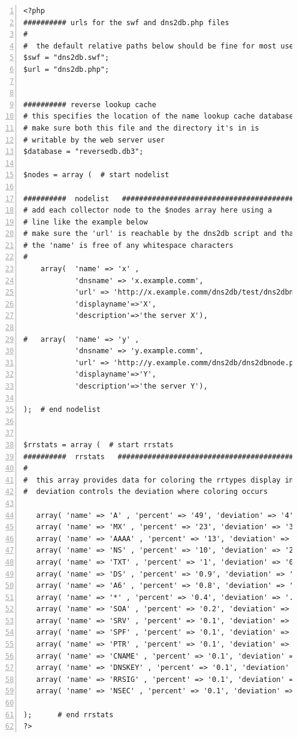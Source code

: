 \documentclass[a4paper]{article}
\begin{document}
\begin{Verbatim}[fontsize=\relsize{-1},numbers=left]
<?php
########## urls for the swf and dns2db.php files
#
#  the default relative paths below should be fine for most users
$swf = "dns2db.swf";
$url = "dns2db.php";


########## reverse lookup cache 
# this specifies the location of the name lookup cache database
# make sure both this file and the directory it's in is 
# writable by the web server user
$database = "reversedb.db3";

$nodes = array (  # start nodelist

##########  nodelist   #########################################################
# add each collector node to the $nodes array here using a 
# line like the example below
# make sure the 'url' is reachable by the dns2db script and that 
# the 'name' is free of any whitespace characters
#
    array(  'name' => 'x' , 
            'dnsname' => 'x.example.comm', 
            'url' => 'http://x.example.comm/dns2db/test/dns2dbnode.php', 
            'displayname'=>'X', 
            'description'=>'the server X'),
            
#   array(  'name' => 'y' , 
            'dnsname' => 'y.example.comm', 
            'url' => 'http://y.example.comm/dns2db/dns2dbnode.php', 
            'displayname'=>'Y', 
            'description'=>'the server Y'),

); 	# end nodelist


$rrstats = array (  # start rrstats
##########  rrstats   #########################################################
#
#  this array provides data for coloring the rrtypes display in the gui
#  deviation controls the deviation where coloring occurs

   array( 'name' => 'A' , 'percent' => '49', 'deviation' => '4'),
   array( 'name' => 'MX' , 'percent' => '23', 'deviation' => '3'),
   array( 'name' => 'AAAA' , 'percent' => '13', 'deviation' => '2'),
   array( 'name' => 'NS' , 'percent' => '10', 'deviation' => '2'),
   array( 'name' => 'TXT' , 'percent' => '1', 'deviation' => '0.5'),
   array( 'name' => 'DS' , 'percent' => '0.9', 'deviation' => '0.5'),
   array( 'name' => 'A6' , 'percent' => '0.8', 'deviation' => '0.5'),
   array( 'name' => '*' , 'percent' => '0.4', 'deviation' => '.3'),
   array( 'name' => 'SOA' , 'percent' => '0.2', 'deviation' => '.2'),
   array( 'name' => 'SRV' , 'percent' => '0.1', 'deviation' => '0.1'),
   array( 'name' => 'SPF' , 'percent' => '0.1', 'deviation' => '0.1'),
   array( 'name' => 'PTR' , 'percent' => '0.1', 'deviation' => '0.1'),
   array( 'name' => 'CNAME' , 'percent' => '0.1', 'deviation' => '0.1'),
   array( 'name' => 'DNSKEY' , 'percent' => '0.1', 'deviation' => '0.1'),
   array( 'name' => 'RRSIG' , 'percent' => '0.1', 'deviation' => '0.1'),
   array( 'name' => 'NSEC' , 'percent' => '0.1', 'deviation' => '0.1'),
                                                
);      # end rrstats
?>
\end{Verbatim}
\end{document}
